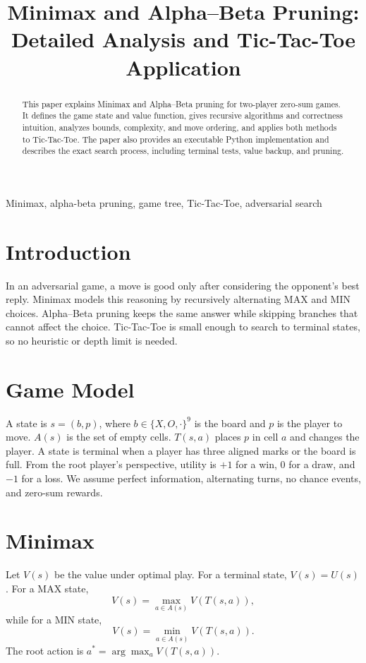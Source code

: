 \documentclass[conference]{IEEEtran}
\title{Minimax and Alpha--Beta Pruning: Detailed Analysis and Tic-Tac-Toe Application}
\author{\IEEEauthorblockN{Student Author}\IEEEauthorblockA{Department of Artificial Intelligence\\University or Institution}}
\begin{document}
\maketitle
\begin{abstract}This paper explains Minimax and Alpha--Beta pruning for two-player zero-sum games. It defines the game state and value function, gives recursive algorithms and correctness intuition, analyzes bounds, complexity, and move ordering, and applies both methods to Tic-Tac-Toe. The paper also provides an executable Python implementation and describes the exact search process, including terminal tests, value backup, and pruning.\end{abstract}
\begin{IEEEkeywords}Minimax, alpha-beta pruning, game tree, Tic-Tac-Toe, adversarial search\end{IEEEkeywords}
\section{Introduction}In an adversarial game, a move is good only after considering the opponent's best reply. Minimax models this reasoning by recursively alternating MAX and MIN choices. Alpha--Beta pruning keeps the same answer while skipping branches that cannot affect the choice. Tic-Tac-Toe is small enough to search to terminal states, so no heuristic or depth limit is needed.
\section{Game Model}A state is $s=(b,p)$, where $b\in\{X,O,\cdot\}^9$ is the board and $p$ is the player to move. $A(s)$ is the set of empty cells. $T(s,a)$ places $p$ in cell $a$ and changes the player. A state is terminal when a player has three aligned marks or the board is full. From the root player's perspective, utility is $+1$ for a win, $0$ for a draw, and $-1$ for a loss. We assume perfect information, alternating turns, no chance events, and zero-sum rewards.
\section{Minimax}Let $V(s)$ be the value under optimal play. For a terminal state, $V(s)=U(s)$. For a MAX state,
\[V(s)=\max_{a\in A(s)} V(T(s,a)),\]
while for a MIN state,
\[V(s)=\min_{a\in A(s)} V(T(s,a)).\]
The root action is $a^*=\arg\max_a V(T(s,a))$.\begin{algorithm}[h]\caption{Recursive Minimax}\end{algorithm}
\end{document}
